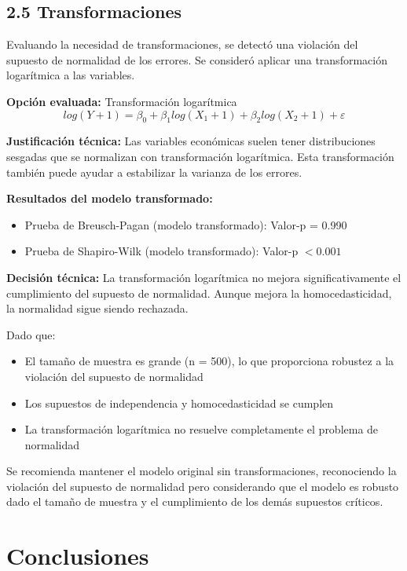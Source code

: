 \documentclass[12pt,a4paper]{article}
\begin{document}
\subsection*{2.5 Transformaciones}

Evaluando la necesidad de transformaciones, se detectó una violación del supuesto de normalidad de los errores. Se consideró aplicar una transformación logarítmica a las variables.

\textbf{Opción evaluada:} Transformación logarítmica
$$log(Y+1) = \beta_0 + \beta_1 log(X_1+1) + \beta_2 log(X_2+1) + \varepsilon$$

\textbf{Justificación técnica:} Las variables económicas suelen tener distribuciones sesgadas que se normalizan con transformación logarítmica. Esta transformación también puede ayudar a estabilizar la varianza de los errores.

\textbf{Resultados del modelo transformado:}
\begin{itemize}
    \item Prueba de Breusch-Pagan (modelo transformado): Valor-p = 0.990
    \item Prueba de Shapiro-Wilk (modelo transformado): Valor-p $< 0.001$
\end{itemize}

\textbf{Decisión técnica:} La transformación logarítmica no mejora significativamente el cumplimiento del supuesto de normalidad. Aunque mejora la homocedasticidad, la normalidad sigue siendo rechazada. 

Dado que:
\begin{itemize}
    \item El tamaño de muestra es grande (n = 500), lo que proporciona robustez a la violación del supuesto de normalidad
    \item Los supuestos de independencia y homocedasticidad se cumplen
    \item La transformación logarítmica no resuelve completamente el problema de normalidad
\end{itemize}

Se recomienda mantener el modelo original sin transformaciones, reconociendo la violación del supuesto de normalidad pero considerando que el modelo es robusto dado el tamaño de muestra y el cumplimiento de los demás supuestos críticos.

\section*{Conclusiones}
\end{document}
